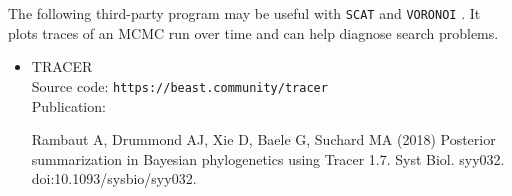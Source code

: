 \documentclass[10pt,titlepage,times,letterpaper]{article}
\def\SCAT{{\tt SCAT} }
\def\VORONOI{{\tt VORONOI} }
\begin{document}
The following third-party program may be useful with \SCAT and \VORONOI.  It
plots traces of an MCMC run over time and can help diagnose search problems.

\begin{itemize}
\item TRACER \\ 
Source code: {\tt https://beast.community/tracer } \\
Publication:

Rambaut A, Drummond AJ, Xie D, Baele G, Suchard MA (2018)  Posterior summarization in Bayesian
phylogenetics using Tracer 1.7.  Syst Biol.  syy032.  doi:10.1093/sysbio/syy032.
\end{itemize}
\end{document}
